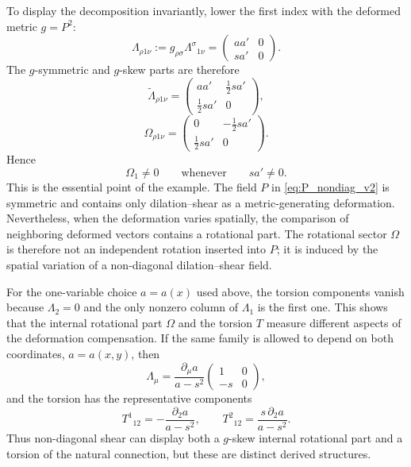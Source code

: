 \documentclass[12pt]{amsart}
\theoremstyle{definition}
\theoremstyle{remark}
\newcommand{\tLambda}{\widetilde{\Lambda}}
\begin{document}
To display the decomposition invariantly, lower the first index with the deformed metric $g=P^2$:
\begin{equation}\label{eq:lowered_Lambda_nondiag_v2}
 \Lambda_{\rho 1\nu}:=g_{\rho\sigma}\Lambda^\sigma{}_{1\nu}
 =\begin{pmatrix}aa'&0\\sa'&0\end{pmatrix}.
\end{equation}
The $g$-symmetric and $g$-skew parts are therefore
\begin{equation}\label{eq:tLambda_nondiag_v2}
 \tLambda_{\rho1\nu}
 =\begin{pmatrix}aa'&\frac12sa'\\\frac12sa'&0\end{pmatrix},
\end{equation}
\begin{equation}\label{eq:Omega_nondiag_v2}
 \Omega_{\rho1\nu}
 =\begin{pmatrix}0&-\frac12sa'\\\frac12sa'&0\end{pmatrix}.
\end{equation}
Hence
\begin{equation}
 \Omega_1\neq0
 \qquad\text{whenever}\qquad sa'\neq0 .
\end{equation}
This is the essential point of the example.  The field $P$ in \eqref{eq:P_nondiag_v2} is symmetric and contains only dilation--shear as a metric-generating deformation.  Nevertheless, when the deformation varies spatially, the comparison of neighboring deformed vectors contains a rotational part.  The rotational sector $\Omega$ is therefore not an independent rotation inserted into $P$; it is induced by the spatial variation of a non-diagonal dilation--shear field.

For the one-variable choice $a=a(x)$ used above, the torsion components vanish because $\Lambda_2=0$ and the only nonzero column of $\Lambda_1$ is the first one.  This shows that the internal rotational part $\Omega$ and the torsion $T$ measure different aspects of the deformation compensation.  If the same family is allowed to depend on both coordinates, $a=a(x,y)$, then
\begin{equation}
 \Lambda_\mu=\frac{\partial_\mu a}{a-s^2}
 \begin{pmatrix}1&0\\-s&0\end{pmatrix},
\end{equation}
and the torsion has the representative components
\begin{equation}\label{eq:shear_torsion_twovar_v2}
 T^1{}_{12}=-\frac{\partial_2 a}{a-s^2},
 \qquad
 T^2{}_{12}=\frac{s\,
\partial_2 a}{a-s^2}.
\end{equation}
Thus non-diagonal shear can display both a $g$-skew internal rotational part and a torsion of the natural connection, but these are distinct derived structures.
\end{document}
